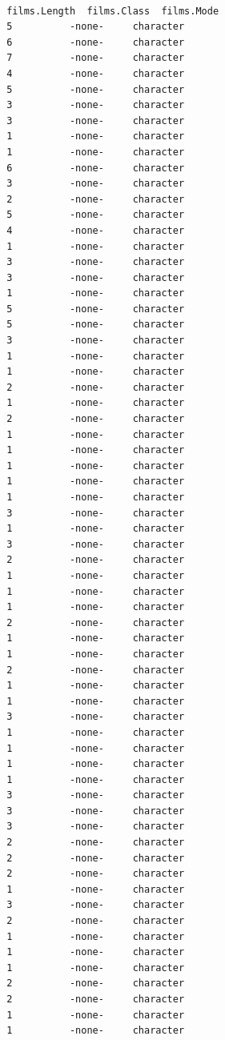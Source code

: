 \documentclass[
  letterpaper,
  DIV=11,
  numbers=noendperiod]{scrreprt}
\begin{document}
\begin{verbatim}
                                                         
 films.Length  films.Class  films.Mode
 5          -none-     character      
 6          -none-     character      
 7          -none-     character      
 4          -none-     character      
 5          -none-     character      
 3          -none-     character      
 3          -none-     character      
 1          -none-     character      
 1          -none-     character      
 6          -none-     character      
 3          -none-     character      
 2          -none-     character      
 5          -none-     character      
 4          -none-     character      
 1          -none-     character      
 3          -none-     character      
 3          -none-     character      
 1          -none-     character      
 5          -none-     character      
 5          -none-     character      
 3          -none-     character      
 1          -none-     character      
 1          -none-     character      
 2          -none-     character      
 1          -none-     character      
 2          -none-     character      
 1          -none-     character      
 1          -none-     character      
 1          -none-     character      
 1          -none-     character      
 1          -none-     character      
 3          -none-     character      
 1          -none-     character      
 3          -none-     character      
 2          -none-     character      
 1          -none-     character      
 1          -none-     character      
 1          -none-     character      
 2          -none-     character      
 1          -none-     character      
 1          -none-     character      
 2          -none-     character      
 1          -none-     character      
 1          -none-     character      
 3          -none-     character      
 1          -none-     character      
 1          -none-     character      
 1          -none-     character      
 1          -none-     character      
 3          -none-     character      
 3          -none-     character      
 3          -none-     character      
 2          -none-     character      
 2          -none-     character      
 2          -none-     character      
 1          -none-     character      
 3          -none-     character      
 2          -none-     character      
 1          -none-     character      
 1          -none-     character      
 1          -none-     character      
 2          -none-     character      
 2          -none-     character      
 1          -none-     character      
 1          -none-     character      

\end{verbatim}
\end{document}
